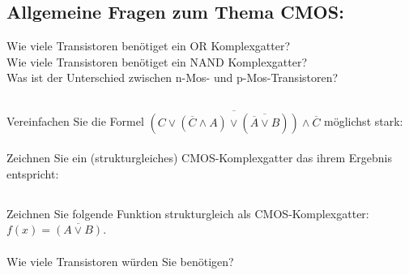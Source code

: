 \subsection{Allgemeine Fragen zum Thema CMOS:}
Wie viele Transistoren benötiget ein OR Komplexgatter?\\[0.3cm]
Wie viele Transistoren benötiget ein NAND Komplexgatter?\\[0.3cm]
Was ist der Unterschied zwischen n-Mos- und p-Mos-Transistoren?\\
\subsection{}
Vereinfachen Sie die Formel $ \overline{\left(C \lor (\overline{C} \land A) \lor (\overline{\overline{A} \lor B})\right) \land \overline{C} } $ möglichst stark: \\
\\[0.3cm]
Zeichnen Sie ein (strukturgleiches) CMOS-Komplexgatter das ihrem Ergebnis entspricht:\\[0.3cm]

\subsection{}
Zeichnen Sie folgende Funktion strukturgleich als CMOS-Komplexgatter: $f(x)= \overline{(A \lor B)}$.\\
\\[0.3cm]
Wie viele Transistoren würden Sie benötigen? 